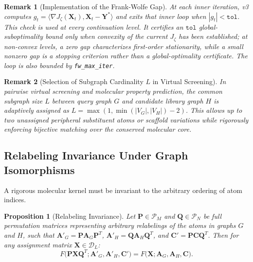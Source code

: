 \documentclass[conference]{IEEEtran}
\newtheorem{proposition}{Proposition}
\newtheorem{remark}{Remark}
\begin{document}
\begin{remark}[Implementation of the Frank-Wolfe Gap]
At each inner iteration, v3 computes $g_t=\langle\nabla J_\zeta(\mathbf{X}_t),\mathbf{X}_t-\mathbf{Y}^*\rangle$ and exits that inner loop when $|g_t|<\texttt{tol}$. This check is used at every continuation level. It certifies an $\texttt{tol}$ global-suboptimality bound only when convexity of the current $J_\zeta$ has been established; at non-convex levels, a zero gap characterizes first-order stationarity, while a small nonzero gap is a stopping criterion rather than a global-optimality certificate. The loop is also bounded by \texttt{fw\_max\_iter}.
\end{remark}

\begin{remark}[Selection of Subgraph Cardinality $L$ in Virtual Screening]
In pairwise virtual screening and molecular property prediction, the common subgraph size $L$ between query graph $G$ and candidate library graph $H$ is adaptively assigned as $L = \max(1, \min(|V_G|, |V_H|) - 2)$. This allows up to two unassigned peripheral substituent atoms or scaffold variations while rigorously enforcing bijective matching over the conserved molecular core.
\end{remark}

\subsection{Relabeling Invariance Under Graph Isomorphisms}

A rigorous molecular kernel must be invariant to the arbitrary ordering of atom indices.

\begin{proposition}[Relabeling Invariance]
\label{prop:relabeling}
Let $\mathbf{P} \in \mathcal{P}_M$ and $\mathbf{Q} \in \mathcal{P}_N$ be full permutation matrices representing arbitrary relabelings of the atoms in graphs $G$ and $H$, such that $\mathbf{A}'_G = \mathbf{P}\mathbf{A}_G\mathbf{P}^T$, $\mathbf{A}'_H = \mathbf{Q}\mathbf{A}_H\mathbf{Q}^T$, and $\mathbf{C}' = \mathbf{P}\mathbf{C}\mathbf{Q}^T$. Then for any assignment matrix $\mathbf{X} \in \mathcal{D}_L$:
\begin{equation}
F\big(\mathbf{P}\mathbf{X}\mathbf{Q}^T; \mathbf{A}'_G, \mathbf{A}'_H, \mathbf{C}'\big) = F\big(\mathbf{X}; \mathbf{A}_G, \mathbf{A}_H, \mathbf{C}\big).
\label{eq:relabeling_invariance}
\end{equation}
\end{proposition}
\end{document}
